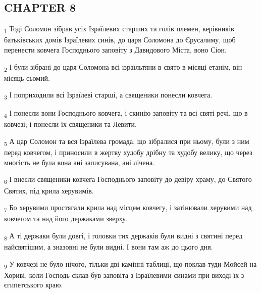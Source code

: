 \subsection{CHAPTER 8}
\begin{tcolorbox}
\textsubscript{1} Тоді Соломон зібрав усіх Ізраїлевих старших та голів племен, керівників батьківських домів Ізраїлевих синів, до царя Соломона до Єрусалиму, щоб перенести ковчега Господнього заповіту з Давидового Міста, воно Сіон.
\end{tcolorbox}
\begin{tcolorbox}
\textsubscript{2} І були зібрані до царя Соломона всі ізраїльтяни в свято в місяці етанім, він місяць сьомий.
\end{tcolorbox}
\begin{tcolorbox}
\textsubscript{3} І поприходили всі Ізраїлеві старші, а священики понесли ковчега.
\end{tcolorbox}
\begin{tcolorbox}
\textsubscript{4} І понесли вони Господнього ковчега, і скинію заповіту та всі святі речі, що в ковчезі; і понесли їх священики та Левити.
\end{tcolorbox}
\begin{tcolorbox}
\textsubscript{5} А цар Соломон та вся Ізраїлева громада, що зібралися при ньому, були з ним перед ковчегом, і приносили в жертву худобу дрібну та худобу велику, що через многість не була вона ані записувана, ані лічена.
\end{tcolorbox}
\begin{tcolorbox}
\textsubscript{6} І внесли священики ковчега Господнього заповіту до девіру храму, до Святого Святих, під крила херувимів.
\end{tcolorbox}
\begin{tcolorbox}
\textsubscript{7} Бо херувими простягали крила над місцем ковчегу, і затінювали херувими над ковчегом та над його держаками зверху.
\end{tcolorbox}
\begin{tcolorbox}
\textsubscript{8} А ті держаки були довгі, і головки тих держаків були видні з святині перед найсвятішим, а зназовні не були видні. І вони там аж до цього дня.
\end{tcolorbox}
\begin{tcolorbox}
\textsubscript{9} У ковчезі не було нічого, тільки дві камінні таблиці, що поклав туди Мойсей на Хориві, коли Господь склав був заповіта з Ізраїлевими синами при виході їх з єгипетського краю.
\end{tcolorbox}

